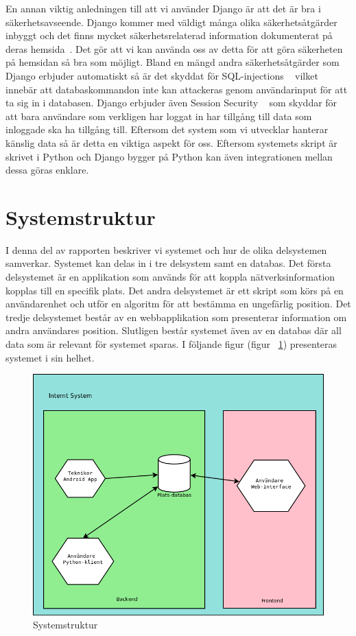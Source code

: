 \documentclass[a4paper,12pt]{article}
\begin{document}
 En annan viktig anledningen till att vi använder Django är att det är bra i säkerhetsavseende. Django kommer med väldigt många olika säkerhetsåtgärder inbyggt och det finns mycket säkerhetsrelaterad information dokumenterat på deras hemsida~\cite{securityInDjango}. Det gör att vi kan använda oss av detta för att göra säkerheten på hemsidan så bra som möjligt. Bland en mängd andra säkerhetsåtgärder som Django erbjuder automatiskt så är det skyddat för SQL-injections ~\cite{securityInDjango} vilket innebär att databaskommandon inte kan attackeras genom användarinput för att ta sig in i databasen. Django erbjuder även Session Security ~\cite{securityInDjango} som skyddar för att bara användare som verkligen har loggat in har tillgång till data som inloggade ska ha tillgång till.
 Eftersom det system som vi utvecklar hanterar känslig data så är detta en viktiga aspekt för oss.
 Eftersom systemets skript är skrivet i Python och Django bygger på Python kan även integrationen mellan dessa göras enklare.

 \section{Systemstruktur}\label{sysstruktur}
 I denna del av rapporten beskriver vi systemet och hur de olika delsystemen samverkar.
 Systemet kan delas in i tre delsystem samt en databas. Det första delsystemet är en applikation som används för att koppla nätverksinformation kopplas till en specifik plats. Det andra delsystemet är ett skript som körs på en användarenhet och utför en algoritm för att bestämma en ungefärlig position. Det tredje delsystemet består av en webbapplikation som presenterar information om andra användares position. Slutligen består systemet även av en databas där all data som är relevant för systemet sparas.
 I följande figur (figur ~\ref{fig:systemStruktur}) presenteras systemet i sin helhet.

 \begin{figure}[H]
 	\includegraphics[width=15cm]{media/systemStruktur.png}
 	\caption{Systemstruktur}
 	\label{fig:systemStruktur}
 \end{figure}
\end{document}
